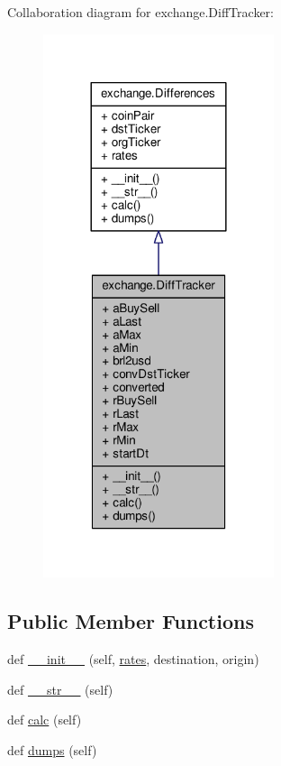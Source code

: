 Collaboration diagram for exchange.\+Diff\+Tracker\+:
\nopagebreak
\begin{figure}[H]
\begin{center}
\leavevmode
\includegraphics[width=192pt]{classexchange_1_1_diff_tracker__coll__graph}
\end{center}
\end{figure}
\subsection*{Public Member Functions}
\begin{DoxyCompactItemize}
\item 
def \hyperlink{classexchange_1_1_diff_tracker_ab9d1d8ef6d877d209ace871e195b284c}{\+\_\+\+\_\+init\+\_\+\+\_\+} (self, \hyperlink{classexchange_1_1_differences_a821ecbc04dae3081f634a28d377c69c3}{rates}, destination, origin)
\item 
def \hyperlink{classexchange_1_1_diff_tracker_a72214c03506722b0554e433615bff766}{\+\_\+\+\_\+str\+\_\+\+\_\+} (self)
\item 
def \hyperlink{classexchange_1_1_diff_tracker_a5289683bd2bd43e75e0062704df53736}{calc} (self)
\item 
def \hyperlink{classexchange_1_1_diff_tracker_aa3c9d92dbe7c7fcf25959fe55c6ba47d}{dumps} (self)
\end{DoxyCompactItemize}

